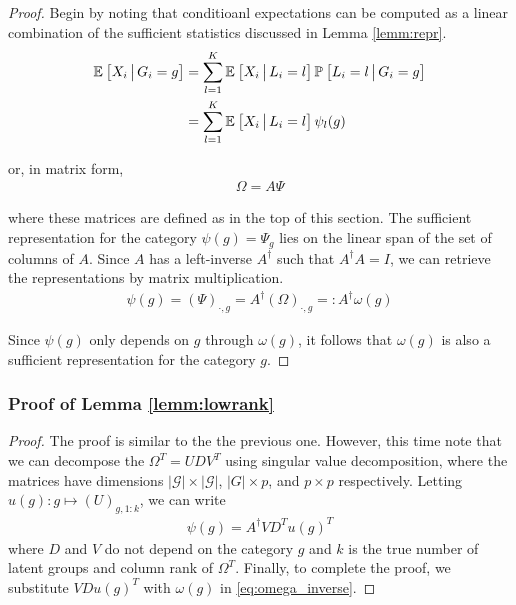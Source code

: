 \documentclass{article}
\theoremstyle{plain}
\theoremstyle{definition}
\theoremstyle{remark}
\begin{document}
\begin{proof} \label{proof:means}
Begin by noting that conditioanl expectations can be computed as a linear combination of the sufficient statistics discussed in Lemma \ref{lemm:repr}.
\begin{align}
    \mathbb{E}_{}\left[ X_{i} \,\big|\, G_{i} = g\right]
    &= \sum_{l=1}^{K} \mathbb{E}_{}\left[X_{i} \,\big|\, L_{i} = l\right] \mathbb{P}_{}\left[L_{i} = l \,\big|\, G_{i} = g\right] \\
    &= \sum_{l=1}^{K} \mathbb{E}_{}\left[X_{i} \,\big|\, L_{i} = l\right] \psi_{l}(g)
    \label{eq:scalar_decomposition}
\end{align}

\noindent or, in matrix form,
\begin{align}
    \Omega = A\Psi
    \label{eq:matrix_decomposition}
\end{align}

where these matrices are defined as in the top of this section. The sufficient representation for the category $\psi(g) = \Psi_{g}$ lies on the linear span of the set of columns of $A$. Since $A$ has a left-inverse $A^\dagger$ such that $A^\dagger A = I$, we can retrieve the representations by matrix multiplication.
\begin{align}
    \psi(g) = (\Psi)_{\cdot, g} = A^\dagger(\Omega)_{\cdot, g} =: A^\dagger \omega(g)
    \label{eq:omega_inverse}
\end{align}

Since $\psi(g)$ only depends on $g$ through $\omega(g)$, it follows that $\omega(g)$ is also a sufficient representation for the category $g$.
\end{proof}



\subsubsection{Proof of Lemma \ref{lemm:lowrank}}

\begin{proof} \label{proof:lowrank}
  The proof is similar to the the previous one. However, this time note that we can decompose the $\Omega^T = U D V^{T}$ using singular value decomposition, where the matrices have dimensions $|\mathcal{G}| \times |\mathcal{G}|$, $|G|\times p$, and $p \times p$ respectively. Letting $u(g) : g \mapsto (U)_{g, 1:k}$, we can write
  \begin{align}
    \psi(g) = A^\dagger V D^T u(g)^T
  \end{align}
  where $D$ and $V$ do not depend on the category $g$ and $k$ is the true number of latent groups and column rank of $\Omega^T$. Finally, to complete the proof, we substitute $V D u(g)^T$ with $\omega(g)$ in \eqref{eq:omega_inverse}.




\end{proof}
\end{document}
